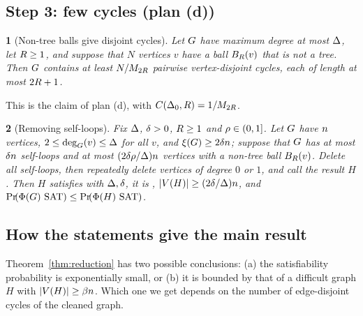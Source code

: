 \documentclass[11pt,a4paper]{article}
\theoremstyle{definition}
\theoremstyle{remark}
\theoremstyle{plain}
\newcommand{\restatedname}{}
\newtheorem*{restatedthm}{\restatedname}
\newenvironment{restate}[2]
  {\renewcommand{\restatedname}{#1}\begin{restatedthm}[#2]}
  {\end{restatedthm}}
\theoremstyle{definition}
\begin{document}
\subsection{Step 3: few cycles (plan (d))}

\begin{restate}{Lemma~\ref{lem:nontree-cycles}}{Non-tree balls give disjoint cycles}
Let \(G\) have maximum degree at most \(\Delta\), let \(R\ge1\), and suppose
that \(N\) vertices \(v\) have a ball \(B_{R}(v)\) that is not a tree. Then \(G\)
contains at least \(N/M_{2R}\) pairwise vertex-disjoint cycles, each of length
at most \(2R+1\).
\end{restate}

\noindent This is the claim of plan (d), with \(C(\Delta_0,R)=1/M_{2R}\).

\begin{restate}{Lemma~\ref{lem:remove-loops}}{Removing self-loops}
Fix \(\Delta\), \(\delta>0\), \(R\ge1\) and \(\rho\in(0,1]\). Let \(G\) have
\(n\) vertices, \(2\le\deg_{G}(v)\le\Delta\) for all \(v\), and
\(\xi(G)\ge2\delta n\); suppose that \(G\) has at most \(\delta n\)
self-loops and at most \((2\delta\rho/\Delta)n\) vertices with a non-tree
ball \(B_{R}(v)\). Delete all self-loops, then repeatedly delete vertices of
degree \(0\) or \(1\), and call the result \(H\). Then \(H\) satisfies \Hyp{}
with \(\Delta,\delta\), it is \loctree{\rad}{\nontree},
\(|V(H)|\ge(2\delta/\Delta)n\), and
\(\Prx{\rform{\Gin}\SAT}\le\Prx{\rform{H}\SAT}\).
\end{restate}

\subsection{How the statements give the main result}

Theorem~\ref{thm:reduction} has two possible conclusions: (a) the
satisfiability probability is exponentially small, or (b) it is bounded by
that of a difficult graph \(H\) with \(|V(H)|\ge\beta n\). Which one we get
depends on the number of edge-disjoint cycles of the cleaned graph.
\end{document}
